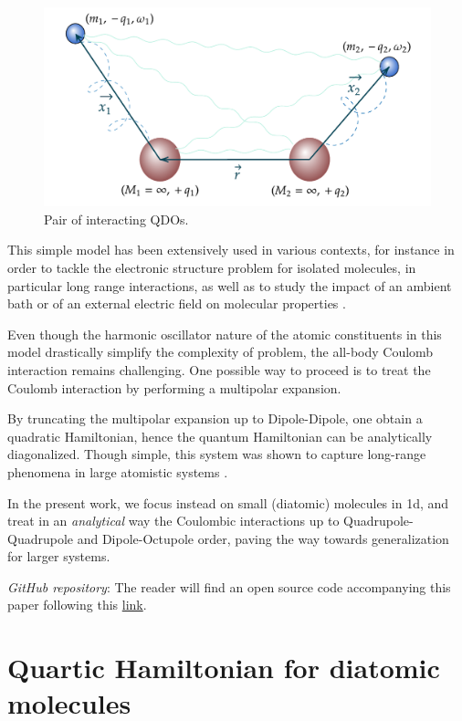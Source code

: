 \documentclass[reprint, amsmath, amssymb, aps, prl]{revtex4-2}
\begin{document}
    \begin{figure}[h!]
    \centering
        \includegraphics[scale=0.49]{QDOs}
        \caption{\label{fig:epsart} Pair of interacting QDOs.}
    \end{figure}

    This simple model has been extensively used in various contexts, for instance in order to tackle the electronic structure problem for isolated molecules, in particular long range interactions, as well as to study the impact of an ambient bath or of an external electric field on molecular properties \cite{Karimpour_2022}.

    Even though the harmonic oscillator nature of the atomic constituents in this model drastically simplify the complexity of problem, the all-body Coulomb interaction remains challenging. One possible way to proceed is to treat the Coulomb interaction by performing a multipolar expansion.

    By truncating the multipolar expansion up to Dipole-Dipole, one obtain a quadratic Hamiltonian, hence the quantum Hamiltonian can be analytically diagonalized. Though simple, this system was shown to capture long-range phenomena in large atomistic systems \cite{https://doi.org/10.48550/arxiv.2205.11549}.

    In the present work, we focus instead on small (diatomic) molecules in 1d, and treat in an \textit{analytical} way the Coulombic interactions up to Quadrupole-Quadrupole and Dipole-Octupole order, paving the way towards generalization for larger systems.

    \textit{GitHub repository}: The reader will find an open source code accompanying this paper following this \href{https://github.com/MatthieuSarkis/Quartic-Potential}{link}.

\section{Quartic Hamiltonian for diatomic molecules}
\end{document}
